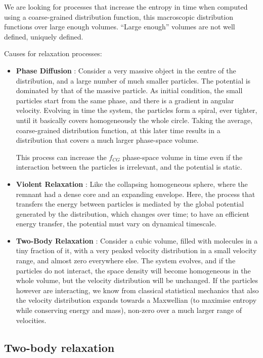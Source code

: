 \documentclass[a4paper,12pt]{article}
\begin{document}
We are looking for processes that increase the entropy in time when computed using a coarse-grained distribution function, this macroscopic distribution functions over large enough volumes. “Large enough” volumes are not well defined, uniquely defined.

Causes for relaxation processes: 

\begin{itemize}
	\item \textbf{Phase Diffusion} : Consider a very massive object in the centre of the distribution, and a large number of much smaller particles. The potential is dominated by that of the massive particle. As initial condition, the small particles start from
the same phase, and there is a gradient in angular velocity. Evolving in time the system, the particles form a spiral, ever tighter, until it basically covers homogeneously the whole circle. Taking the average, coarse-grained distribution function, at this later time results in a distribution that covers a much larger phase-space volume.

This process can increase the $f_{CG}$ phase-space volume in time even if the interaction between the particles is irrelevant, and the potential is static.

	\item \textbf{Violent Relaxation} : Like the collapsing homogeneous sphere, where the remnant had a dense core and an expanding envelope. Here, the process that transfers the energy between particles is mediated by the global potential generated by the distribution, which changes over time; to have an efficient energy transfer, the potential must vary on dynamical timescale.
	
	\item \textbf{Two-Body Relaxation} : Consider a cubic volume, filled with molecules in a tiny fraction of it, with a very peaked velocity distribution in a small velocity range, and almost zero everywhere else. The system evolves, and if the particles do not
interact, the space density will become homogeneous in the whole volume, but the velocity distribution will be unchanged. If the particles however are interacting, we know from classical statistical mechanics that also the velocity distribution expands towards a Maxwellian (to maximise entropy while conserving energy and mass), non-zero over a much larger range of velocities. 
	
\end{itemize}

\subsection{Two-body relaxation}
\end{document}
